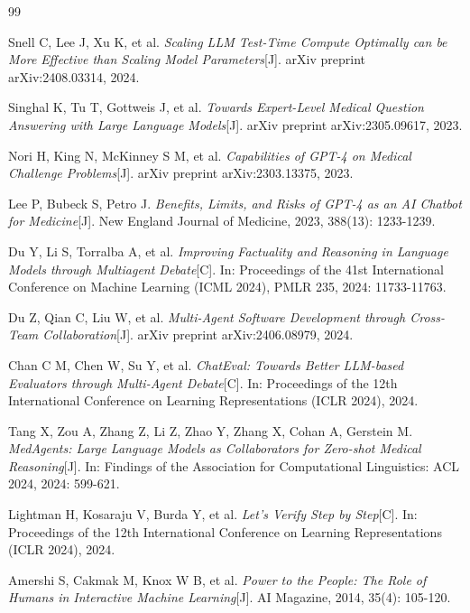 \documentclass[11pt,a4paper]{ctexart}
\begin{document}
\newpage
\begin{thebibliography}{99}

Snell C, Lee J, Xu K, et al.
\emph{Scaling LLM Test-Time Compute Optimally can be More Effective than Scaling Model Parameters}[J].
arXiv preprint arXiv:2408.03314, 2024.

Singhal K, Tu T, Gottweis J, et al.
\emph{Towards Expert-Level Medical Question Answering with Large Language Models}[J].
arXiv preprint arXiv:2305.09617, 2023.

Nori H, King N, McKinney S M, et al.
\emph{Capabilities of GPT-4 on Medical Challenge Problems}[J].
arXiv preprint arXiv:2303.13375, 2023.

Lee P, Bubeck S, Petro J.
\emph{Benefits, Limits, and Risks of GPT-4 as an AI Chatbot for Medicine}[J].
New England Journal of Medicine, 2023, 388(13): 1233-1239.

Du Y, Li S, Torralba A, et al.
\emph{Improving Factuality and Reasoning in Language Models through Multiagent Debate}[C].
In: Proceedings of the 41st International Conference on Machine Learning (ICML 2024), PMLR 235, 2024: 11733-11763.

Du Z, Qian C, Liu W, et al.
\emph{Multi-Agent Software Development through Cross-Team Collaboration}[J].
arXiv preprint arXiv:2406.08979, 2024.

Chan C M, Chen W, Su Y, et al.
\emph{ChatEval: Towards Better LLM-based Evaluators through Multi-Agent Debate}[C].
In: Proceedings of the 12th International Conference on Learning Representations (ICLR 2024), 2024.

Tang X, Zou A, Zhang Z, Li Z, Zhao Y, Zhang X, Cohan A, Gerstein M.
\emph{MedAgents: Large Language Models as Collaborators for Zero-shot Medical Reasoning}[J].
In: Findings of the Association for Computational Linguistics: ACL 2024, 2024: 599-621.

Lightman H, Kosaraju V, Burda Y, et al.
\emph{Let's Verify Step by Step}[C].
In: Proceedings of the 12th International Conference on Learning Representations (ICLR 2024), 2024.

Amershi S, Cakmak M, Knox W B, et al.
\emph{Power to the People: The Role of Humans in Interactive Machine Learning}[J].
AI Magazine, 2014, 35(4): 105-120.


\end{thebibliography}
\end{document}
